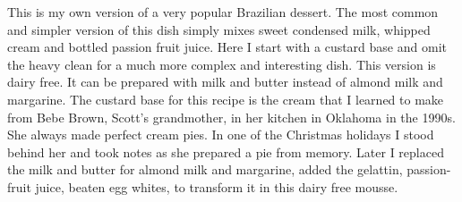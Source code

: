 \documentclass[11pt,letterpaper]{article}
\begin{document}



This is my own version of a very popular Brazilian dessert. The most common and simpler version of this dish simply mixes sweet condensed milk, whipped cream and bottled passion fruit juice. Here I start with a custard base and omit the heavy clean for a much more complex and interesting dish. This version is dairy free. It can be prepared with milk and butter instead of almond milk and margarine. The custard base for this recipe is the cream that I learned to make from Bebe Brown, Scott's grandmother, in her kitchen in Oklahoma in the 1990s. She always made perfect cream pies. In one of the Christmas holidays I stood behind her and took notes as she prepared a pie from memory. Later I replaced the milk and butter for almond milk and margarine, added the gelattin, passion-fruit juice, beaten egg whites, to transform it in this dairy free mousse.
\end{document}
